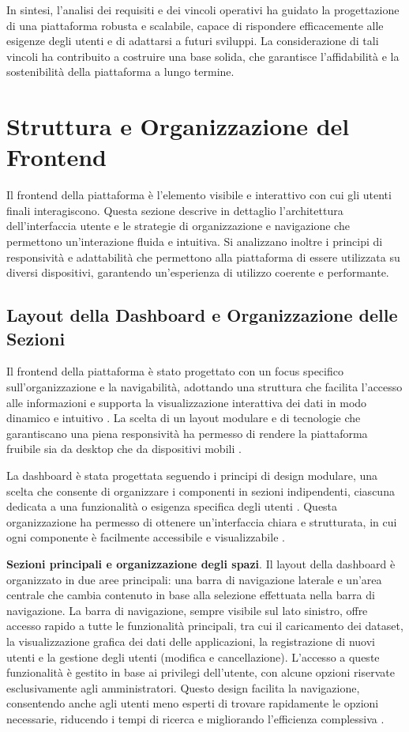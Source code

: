 In sintesi, l’analisi dei requisiti e dei vincoli operativi ha guidato la progettazione di una piattaforma robusta e scalabile, capace di rispondere efficacemente alle esigenze degli utenti e di adattarsi a futuri sviluppi. La considerazione di tali vincoli ha contribuito a costruire una base solida, che garantisce l’affidabilità e la sostenibilità della piattaforma a lungo termine.

\section{Struttura e Organizzazione del Frontend}

Il frontend della piattaforma è l'elemento visibile e interattivo con cui gli utenti finali interagiscono. Questa sezione descrive in dettaglio l'architettura dell'interfaccia utente e le strategie di organizzazione e navigazione che permettono un'interazione fluida e intuitiva. Si analizzano inoltre i principi di responsività e adattabilità che permettono alla piattaforma di essere utilizzata su diversi dispositivi, garantendo un'esperienza di utilizzo coerente e performante.

\subsection{Layout della Dashboard e Organizzazione delle Sezioni}
Il frontend della piattaforma è stato progettato con un focus specifico sull’organizzazione e la navigabilità, adottando una struttura che facilita l’accesso alle informazioni e supporta la visualizzazione interattiva dei dati in modo dinamico e intuitivo \cite{cooper2014}. La scelta di un layout modulare e di tecnologie che garantiscano una piena responsività ha permesso di rendere la piattaforma fruibile sia da desktop che da dispositivi mobili \cite{w3c2018}.

La dashboard è stata progettata seguendo i principi di design modulare, una scelta che consente di organizzare i componenti in sezioni indipendenti, ciascuna dedicata a una funzionalità o esigenza specifica degli utenti \cite{shneiderman2016designing}. Questa organizzazione ha permesso di ottenere un’interfaccia chiara e strutturata, in cui ogni componente è facilmente accessibile e visualizzabile \cite{nielsen1994}.

\textbf{Sezioni principali e organizzazione degli spazi}. Il layout della dashboard è organizzato in due aree principali: una barra di navigazione laterale e un'area centrale che cambia contenuto in base alla selezione effettuata nella barra di navigazione. La barra di navigazione, sempre visibile sul lato sinistro, offre accesso rapido a tutte le funzionalità principali, tra cui il caricamento dei dataset, la visualizzazione grafica dei dati delle applicazioni, la registrazione di nuovi utenti e la gestione degli utenti (modifica e cancellazione). L’accesso a queste funzionalità è gestito in base ai privilegi dell’utente, con alcune opzioni riservate esclusivamente agli amministratori. Questo design facilita la navigazione, consentendo anche agli utenti meno esperti di trovare rapidamente le opzioni necessarie, riducendo i tempi di ricerca e migliorando l’efficienza complessiva \cite{feldmann2002scalability}.


